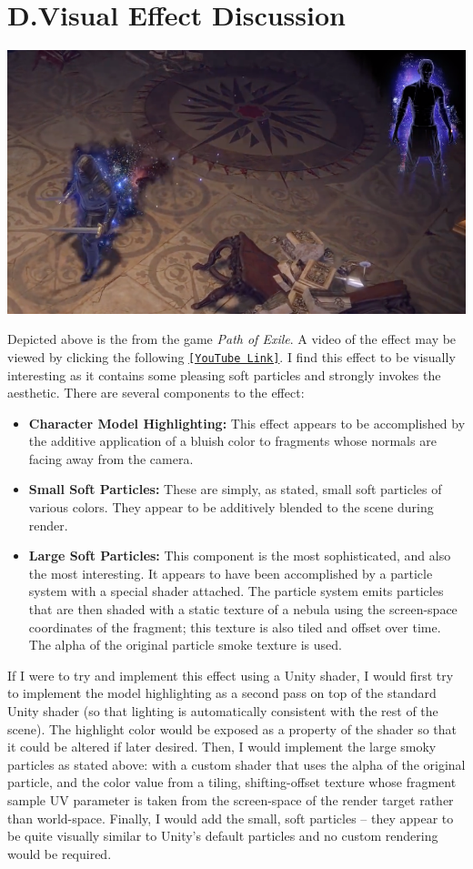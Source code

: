 \documentclass[11pt]{article}
\newcommand{\makesection}[2]{\newpage\section*{#1.\quad #2}}
\begin{document}
\makesection{D}{Visual Effect Discussion}
\begin{center}
	\includegraphics[width=\linewidth]{PoEFX.png}
\end{center}
Depicted above is the  from the game \textit{Path of Exile}. A video of the effect may be viewed by clicking the following \href{https://www.youtube.com/watch?v=tiFfWGNF_l8}{\texttt{[YouTube Link]}}. I find this effect to be visually interesting as it contains some pleasing soft particles and strongly invokes the  aesthetic. There are several components to the effect:

\begin{itemize}
	\item \textbf{Character Model Highlighting:} This effect appears to be accomplished by the additive application of a bluish color to fragments whose normals are facing away from the camera.
	\item \textbf{Small Soft Particles:} These are simply, as stated, small soft particles of various colors. They appear to be additively blended to the scene during render.
	\item \textbf{Large Soft Particles:} This component is the most sophisticated, and also the most interesting. It appears to have been accomplished by a particle system with a special shader attached. The particle system emits  particles that are then shaded with a static texture of a nebula using the screen-space coordinates of the fragment; this texture is also tiled and offset over time. The alpha of the original particle smoke texture is used.
\end{itemize}

If I were to try and implement this effect using a Unity shader, I would first try to implement the model highlighting as a second pass on top of the standard Unity shader (so that lighting is automatically consistent with the rest of the scene). The highlight color would be exposed as a property of the shader so that it could be altered if later desired. Then, I would implement the large smoky particles as stated above: with a custom shader that uses the alpha of the original particle, and the color value from a tiling, shifting-offset texture whose fragment sample UV parameter is taken from the screen-space of the render target rather than world-space. Finally, I would add the small, soft particles -- they appear to be quite visually similar to Unity's default particles and no custom rendering would be required.
\end{document}
